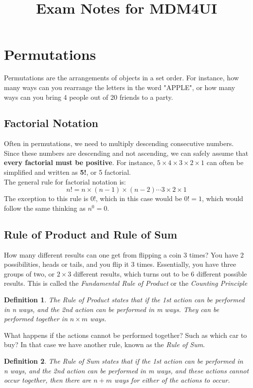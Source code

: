 \documentclass[final,1p,12pt]{elsarticle}
\newtheorem{definition}{Definition}
\begin{document}
\begin{frontmatter}
    \title{Exam Notes for MDM4UI}
    
\end{frontmatter}

\section{Permutations}
Permutations are the arrangements of objects in a set order. 
For instance, how many ways can you rearrange the letters in the word "APPLE", 
or how many ways can you bring 4 people out of 20 friends to a party.

    \subsection{Factorial Notation}
    Often in permutations, we need to multiply descending consecutive numbers. Since these numbers
    are descending and not ascending, we can safely assume that \textbf{every factorial must be positive}. 
    For instance,  $5\times4\times3\times2\times1$ can often be simplified and written as \textbf{5!}, or 5 factorial.\\
    The general rule for factorial notation is: 
    \begin{equation}%
        n! = n\times(n-1)\times(n-2)\cdots3\times2\times1
    \end{equation}
    The exception to this rule is 0!, which in this case would be $0! = 1$, which would follow the same thinking as $n^0=0$.%
    
    \subsection{Rule of Product and Rule of Sum}
    How many different results can one get from flipping a coin 3 times? You have 2 possibilities, heads or tails, and you flip it 3 times. Essentially, you have three groups of two, or $2\times3$ different results, which turns out to be $6$ different possible results. This is called the \emph{Fundamental Rule of Product} or the \emph{Counting Principle}
    \begin{definition}
        The Rule of Product states that if the 1st action can be performed in n ways, and the 2nd action can be performed in m ways.
        They can be performed together in $n\times m$ ways. 
    \end{definition}
    \clearpage
    What happens if the actions cannot be performed together? Such as which car to buy? In that case we have another rule, known as the \emph{Rule of Sum}.
    \begin{definition}
        The Rule of Sum states that if the 1st action can be performed in n ways, and the 2nd action can be performed in m ways, and these actions cannot occur together, then there are $n+m$ ways for either of the actions to occur.
    \end{definition}
    
\end{document}
